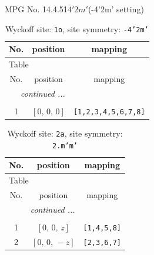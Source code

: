 \documentclass[fleqn,8pt]{jsarticle}
\begin{document}
\setcounter{MaxMatrixCols}{32}

\renewcommand{\tablename}{Table~}
\renewcommand{\figurename}{Figure~}
\begin{center}
\LARGE
MPG No. 14.4.51\quad$\bar{4}'2m'$\quad(-4'2m' setting)
\end{center}
\renewcommand{\arraystretch}{1.2}
\begin{longtable}{ccc}
\caption{Wyckoff site: {\tt 1o}, site symmetry: {\tt -4'2m'}}
 \\
 \hline \hline
No. & position & mapping \\ \hline \endfirsthead

\multicolumn{2}{l}{\tablename\ \thetable{}} \\
 \hline \hline
No. & position & mapping \\ \hline \endhead

 \hline \hline
\multicolumn{2}{r}{\footnotesize\it continued ...} \\ \endfoot

 \hline \hline
\multicolumn{2}{r}{} \\ \endlastfoot

1 & $\left[ 0,\, 0,\, 0 \right]$ & {\tt [1,2,3,4,5,6,7,8]} \\
\end{longtable}
\renewcommand{\arraystretch}{1.2}
\begin{longtable}{ccc}
\caption{Wyckoff site: {\tt 2a}, site symmetry: {\tt 2.m'm'}}
 \\
 \hline \hline
No. & position & mapping \\ \hline \endfirsthead

\multicolumn{2}{l}{\tablename\ \thetable{}} \\
 \hline \hline
No. & position & mapping \\ \hline \endhead

 \hline \hline
\multicolumn{2}{r}{\footnotesize\it continued ...} \\ \endfoot

 \hline \hline
\multicolumn{2}{r}{} \\ \endlastfoot

1 & $\left[ 0,\, 0,\, z \right]$ & {\tt [1,4,5,8]} \\ \hline
2 & $\left[ 0,\, 0,\, - z \right]$ & {\tt [2,3,6,7]} \\
\end{longtable}
\renewcommand{\arraystretch}{1.2}
\end{document}
